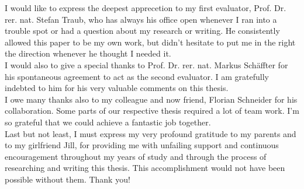 \setlength\parindent{0pt}

I would like to express the deepest apprecetion to my first evaluator, Prof. Dr. rer. nat. Stefan Traub, who has always his office open whenever I ran into a trouble spot or had a question about my research or writing. He consistently allowed this paper to be my own work, but didn't hesitate to put me in the right the direction whenever he thought I needed it. \\

I would also to give a special thanks to Prof. Dr. rer. nat. Markus Sch{\"a}ffter for his spontaneous agreement to act as the second evaluator. I am gratefully indebted to him for his very valuable comments on this thesis. \\

I owe many thanks also to my colleague and now friend, Florian Schneider for his collaboration. Some parts of our respective thesis required a lot of team work. I'm so grateful that we could achieve a fantastic job together. \\

Last but not least, I must express my very profound gratitude to my parents and to my girlfriend Jill, for providing me with unfailing support and continuous encouragement throughout my years of study and through the process of researching and writing this thesis. This accomplishment would not have been possible without them. Thank you!
